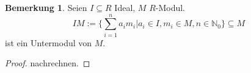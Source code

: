 \documentclass[a4paper, titlepage]{article}
\theoremstyle{definition}
\newtheorem{bem}[satz]{Bemerkung}
\newcommand{\N}{\mathbb{N}}
\begin{document}
        \begin{bem}
        Seien $I\subseteq R$ Ideal, $M$ $R$-Modul.
        $$IM:=\{\sum_{i=1}^{n}a_im_i|a_i\in I, m_i\in M,n\in \N_0\}\subseteq M$$
        ist ein Untermodul von $M.$
        \end{bem}
        \begin{proof}
            nachrechnen.
        \end{proof}
        
        
\end{document}
